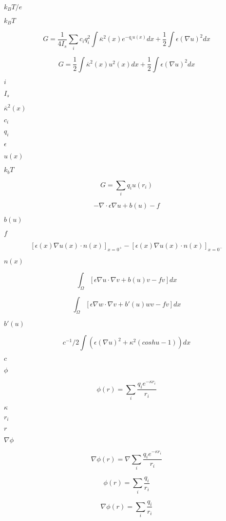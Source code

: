 \documentclass{article}
\begin{document}
$k_B T/e$
\pagebreak

$k_B T$
\pagebreak

\[ G = \frac{1}{4 I_s} \sum_i c_i q_i^2 \int \overline{\kappa}^2(x) e^{-q_i u(x)} dx + \frac{1}{2} \int \epsilon ( \nabla u )^2 dx \]
\pagebreak

\[ G = \frac{1}{2} \int \overline{\kappa}^2(x) u^2(x) dx + \frac{1}{2} \int \epsilon ( \nabla u )^2 dx \]
\pagebreak

$i$
\pagebreak

$I_s$
\pagebreak

$\overline{\kappa}^2(x)$
\pagebreak

$c_i$
\pagebreak

$q_i$
\pagebreak

$\epsilon$
\pagebreak

$u(x)$
\pagebreak

$k_b T$
\pagebreak

\[ G = \sum_i q_i u(r_i) \]
\pagebreak

\[ -\nabla \cdot \epsilon \nabla u + b(u) - f \]
\pagebreak

$b(u)$
\pagebreak

$f$
\pagebreak

\[ [\epsilon(x) \nabla u(x) \cdot n(x)]_{x=0^+} - [\epsilon(x) \nabla u(x) \cdot n(x)]_{x=0^-} \]
\pagebreak

$n(x)$
\pagebreak

\[ \int_\Omega \left[ \epsilon \nabla u \cdot \nabla v + b(u) v - f v \right] dx \]
\pagebreak

\[ \int_\Omega \left[ \epsilon \nabla w \cdot \nabla v + b'(u) w v - f v \right] dx \]
\pagebreak

$b'(u)$
\pagebreak

\[ c^{-1}/2 \int (\epsilon (\nabla u)^2 + \kappa^2 (cosh u - 1)) dx \]
\pagebreak

$c$
\pagebreak

$\phi$
\pagebreak

\[ \phi(r) = \sum_i \frac{q_i e^{-\kappa r_i}}{r_i} \]
\pagebreak

$\kappa$
\pagebreak

$r_i$
\pagebreak

$r$
\pagebreak

$\nabla \phi$
\pagebreak

\[ \nabla \phi(r) = \nabla \sum_i \frac{q_i e^{-\kappa r_i}}{r_i} \]
\pagebreak

\[ \phi(r) = \sum_i \frac{q_i}{r_i} \]
\pagebreak

\[ \nabla \phi(r) = \sum_i \frac{q_i}{r_i} \]
\pagebreak
\end{document}
